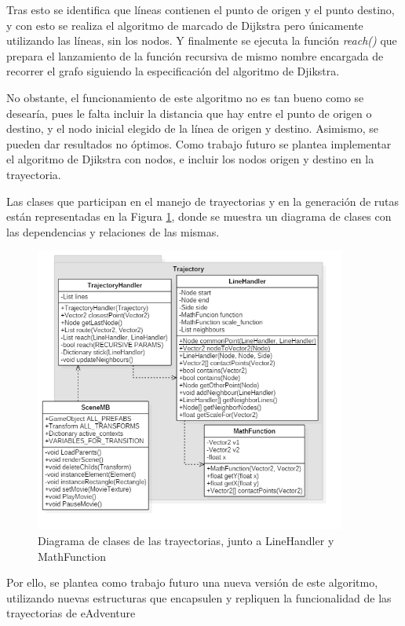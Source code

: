 Tras esto se identifica que líneas contienen el punto de origen y el punto destino, y con esto se realiza el algoritmo de marcado de Dijkstra pero únicamente utilizando las líneas, sin los nodos. Y finalmente se ejecuta la función \textit{reach()} que prepara el lanzamiento de la función recursiva de mismo nombre encargada de recorrer el grafo siguiendo la especificación del algoritmo de Djikstra.

No obstante, el funcionamiento de este algoritmo no es tan bueno como se desearía, pues le falta incluir la distancia que hay entre el punto de origen o destino, y el nodo inicial elegido de la línea de origen y destino. Asimismo, se pueden dar resultados no óptimos. Como trabajo futuro se plantea implementar el algoritmo de Djikstra con nodos, e incluir los nodos origen y destino en la trayectoria.

Las clases que participan en el manejo de trayectorias y en la generación de rutas están representadas en la Figura \ref{trajectoryfigit2}, donde se muestra un diagrama de clases con las dependencias y relaciones de las mismas. 

\begin{figure}[h!]
	\centerline{\includegraphics[height=3.7in]{figures/it2/TrajectoryHandler.png}}
	\caption[TrajectoryHandler - Versión Final]{Diagrama de clases de las trayectorias, junto a LineHandler y MathFunction}
	\label{trajectoryfigit2}
\end{figure}

\newpage
 Por ello, se plantea como trabajo futuro una nueva versión de este algoritmo, utilizando nuevas estructuras que encapsulen y repliquen la funcionalidad de las trayectorias de eAdventure
\newpage

